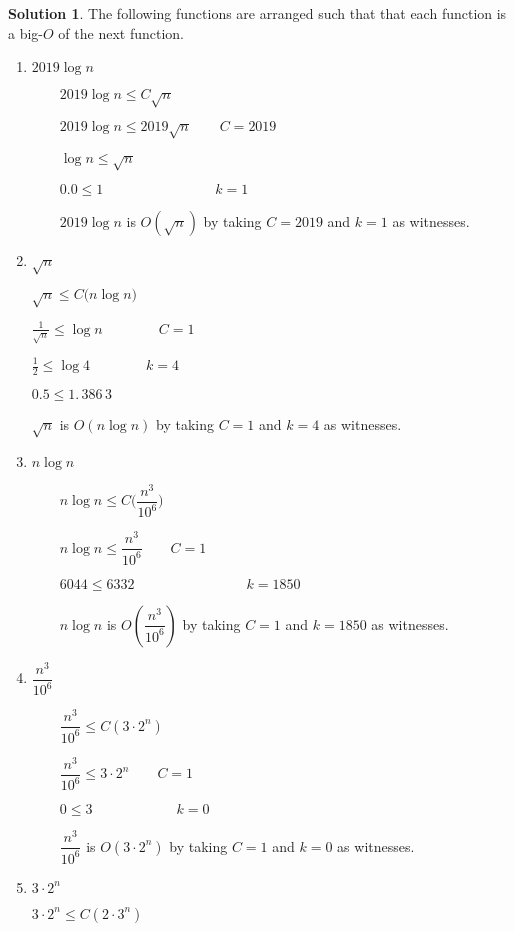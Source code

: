\documentclass{article}
\theoremstyle{definition}
\newtheorem*{solution}{Solution}
\begin{document}
\begin{solution}
The following functions are arranged such that that each function is a big-$%
O $ of the next function.

\begin{enumerate}
\item $2019\log {n}$

$\qquad 2019\log {n\leq C}\sqrt{n}$

$\qquad 2019\log {n\leq 2019}\sqrt{n}\qquad C=2019$

$\qquad \log {n\leq }\sqrt{n}$

$\qquad 0.0\leq 1\qquad \qquad \qquad \qquad k=1$

$\qquad 2019\log {n}$ is $O(\sqrt{n})$ by taking $C=2019$ and $k=1$ as
witnesses. \bigskip

\item $\sqrt{n}$

\qquad $\sqrt{n}\leq C(n\log {n)}$

\qquad $\frac{1}{\sqrt{n}}\leq \log {n\qquad \qquad C=1}$

\qquad $\frac{1}{2}\leq \log 4\qquad \qquad k=4$

\qquad $0.5\leq 1.\,\allowbreak 386\,3$

\qquad $\sqrt{n}$ is $O(n\log {n})$ by taking $C=1$ and $k=4$ as witnesses.
\bigskip

\item $n\log {n}$

$\qquad n\log {n\leq C(}\dfrac{n^{3}}{10^{6}})$

$\qquad n\log {n\leq }\dfrac{n^{3}}{10^{6}}\qquad C=1$

$\qquad 6044\leq 6332\qquad \qquad \qquad \qquad k=1850$

$\qquad n\log {n}$ is $O(\dfrac{n^{3}}{10^{6}})$ by taking $C=1$ and $k=1850$
as witnesses. \bigskip

\item $\dfrac{n^{3}}{10^{6}}$

$\qquad \dfrac{n^{3}}{10^{6}}\leq C(3\cdot 2^{n})$

$\qquad \dfrac{n^{3}}{10^{6}}\leq 3\cdot 2^{n}\qquad C=1$

$\qquad 0\leq 3\qquad \qquad \qquad k=0$

$\qquad \dfrac{n^{3}}{10^{6}}$ is $O(3\cdot 2^{n})$ by taking $C=1$ and $k=0$
as witnesses. \bigskip

\item $3\cdot 2^{n}$

\qquad $3\cdot 2^{n}\leq C(2\cdot 3^{n})$


\end{enumerate}
\end{solution}
\end{document}
